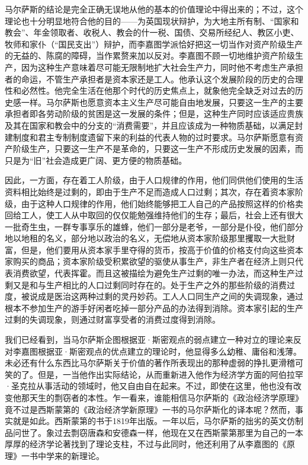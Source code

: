 马尔萨斯的结论是完全正确无误地从他的基本的价值理论中得出来的；不过，这个理论也十分明显地符合他的目的——为英国现状辩护，为大地主所有制、“国家和教会”、年金领取者、收税人、教会的什一税、国债、交易所经纪人、教区小吏、牧师和家仆（“国民支出”）辩护，而李嘉图学派恰好把这一切当作对资产阶级生产的无益的、陈腐的障碍，当作累赘来加以反对。李嘉图不顾一切地维护资产阶级生产，因为这种生产意味着尽可能无限制地扩大社会生产力，同时他不考虑生产承担者的命运，不管生产承担者是资本家还是工人。他承认这个发展阶段的历史的合理性和必然性。他完全生活在他那个时代的历史焦点上，就象他完全缺乏对过去的历史感一样。马尔萨斯也愿意资本主义生产尽可能自由地发展，只要这一生产的主要承担者即各劳动阶级的贫困是这一发展的条件；但是，这种生产同时应该适应贵族及其在国家和教会中的分支的“消费需要”，并且应该成为一种物质基础，以满足封建制度和君主专制制度遗留下来的利益的代表人物的过时要求。马尔萨斯愿意有资产阶级生产，只要这一生产不是革命的，只要这一生产不形成历史发展的因素，而只是为“旧”社会造成更广阔、更方便的物质基础。

因此，一方面，存在着工人阶级，由于人口规律的作用，他们同供他们使用的生活资料相比始终是过剩的，即由于生产不足而造成人口过剩；其次，存在着资本家阶级，由于这种人口规律的作用，他们始终能够把工人自己的产品按照这样的价格卖回给工人，使工人从中取回的仅仅能勉强维持他们的生存；最后，社会上还有很大一批奇生虫，一群专事享乐的雄蜂，他们一部分是老爷，一部分是仆役，他们部分地以地租的名义，部分地以政治的名义，无偿地从资本家阶级那里攫取一大批财富，但是，他们要用从资本家手里夺得的货币，按高于价值的价格支付向这些资本家购买的商品；资本家阶级受积累欲望的驱使从事生产，非生产者在经济上则只代表消费欲望，代表挥霍。而且这被描绘为避免生产过剩的唯一办法，而这种生产过剩又是和与生产相比的人口过剩同时存在的。处于生产之外的那些阶级的消费过度，被说成是医治这两种过剩的灵丹妙药。工人人口同生产之间的失调现象，通过根本不参加生产的游手好闲者吃掉一部分产品的办法得到消除。资本家引起的生产过剩的失调现象，则通过财富享受者的消费过度得到消除。

我们已经看到，当马尔萨斯企图根据亚·斯密观点的弱点建立一种对立的理论来反对李嘉图根据亚·斯密观点的优点建立的理论时，他显得多么幼稚、庸俗和浅薄。未必还有什么东西比马尔萨斯关于价值的著作所表现出的那种虚弱的挣扎更滑稽可笑的了。但是，一当他作出实际结论，从而重新进入他作为经济学方面的阿伯拉罕·圣克拉从事活动的领域时，他又自由自在起来。不过，即使在这里，他也没有改变他那天生的剽窃者的本性。乍一看来，谁能相信马尔萨斯的《政治经济学原理》竟不过是西斯蒙第的《政治经济学新原理》一书的马尔萨斯化的译本呢？然而，事实就是如此。西斯蒙第的书于1819年出版。一年以后，马尔萨斯的拙劣的英文仿制品问世了。象过去剽窃唐森和安德森一样，他现在又在西斯蒙第那里为自己的一本厚厚的经济学论著找到了理论支柱，不过与此同时，他还利用了从李嘉图的《原理》一书中学来的新理论。

